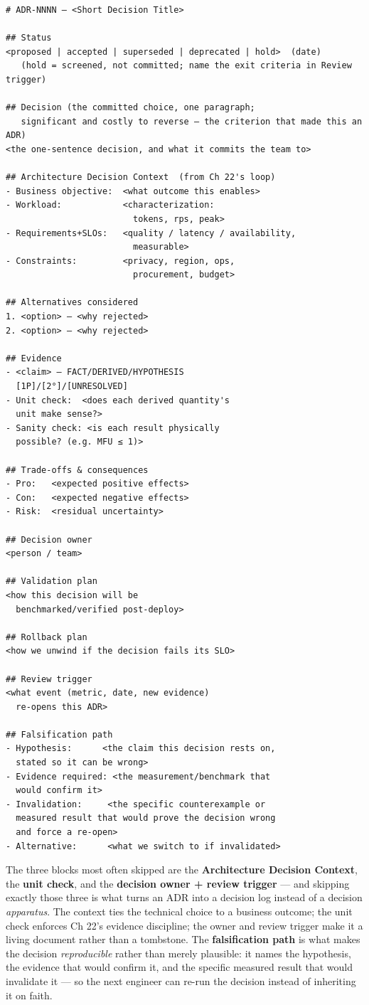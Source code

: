 \begin{Verbatim}[breaklines=true, breakanywhere=true, fontsize=\small]
# ADR-NNNN — <Short Decision Title>

## Status
<proposed | accepted | superseded | deprecated | hold>  (date)
   (hold = screened, not committed; name the exit criteria in Review trigger)

## Decision (the committed choice, one paragraph;
   significant and costly to reverse — the criterion that made this an ADR)
<the one-sentence decision, and what it commits the team to>

## Architecture Decision Context  (from Ch 22's loop)
- Business objective:  <what outcome this enables>
- Workload:            <characterization:
                         tokens, rps, peak>
- Requirements+SLOs:   <quality / latency / availability,
                         measurable>
- Constraints:         <privacy, region, ops,
                         procurement, budget>

## Alternatives considered
1. <option> — <why rejected>
2. <option> — <why rejected>

## Evidence
- <claim> — FACT/DERIVED/HYPOTHESIS
  [1P]/[2°]/[UNRESOLVED]
- Unit check:  <does each derived quantity's
  unit make sense?>
- Sanity check: <is each result physically
  possible? (e.g. MFU ≤ 1)>

## Trade-offs & consequences
- Pro:   <expected positive effects>
- Con:   <expected negative effects>
- Risk:  <residual uncertainty>

## Decision owner
<person / team>

## Validation plan
<how this decision will be
  benchmarked/verified post-deploy>

## Rollback plan
<how we unwind if the decision fails its SLO>

## Review trigger
<what event (metric, date, new evidence)
  re-opens this ADR>

## Falsification path
- Hypothesis:      <the claim this decision rests on,
  stated so it can be wrong>
- Evidence required: <the measurement/benchmark that
  would confirm it>
- Invalidation:     <the specific counterexample or
  measured result that would prove the decision wrong
  and force a re-open>
- Alternative:      <what we switch to if invalidated>
\end{Verbatim}

The three blocks most often skipped are the \textbf{Architecture
Decision Context}, the \textbf{unit check}, and the \textbf{decision
owner + review trigger} --- and skipping exactly those three is what
turns an ADR into a decision log instead of a decision \emph{apparatus}.
The context ties the technical choice to a business outcome; the unit
check enforces Ch 22's evidence discipline; the owner and review trigger
make it a living document rather than a tombstone. The
\textbf{falsification path} is what makes the decision
\emph{reproducible} rather than merely plausible: it names the
hypothesis, the evidence that would confirm it, and the specific
measured result that would invalidate it --- so the next engineer can
re-run the decision instead of inheriting it on faith.

